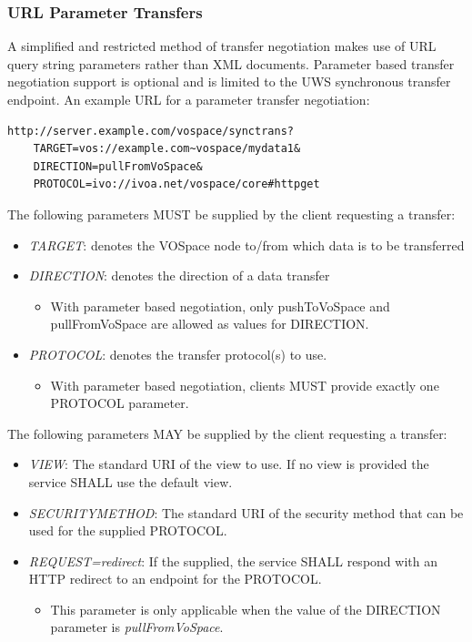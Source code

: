 \documentclass[11pt,a4paper]{ivoa}
\begin{document}
\subsubsection{URL Parameter Transfers}
\label{subsubsec:url parameter transfers}
A simplified and restricted method of transfer negotiation makes use of URL query string parameters rather than XML documents.  Parameter based transfer negotiation support is optional and is limited to the UWS synchronous transfer endpoint.  An example URL for a parameter transfer negotiation:

\begin{verbatim}
http://server.example.com/vospace/synctrans?
    TARGET=vos://example.com~vospace/mydata1&
    DIRECTION=pullFromVoSpace&
    PROTOCOL=ivo://ivoa.net/vospace/core#httpget
\end{verbatim}

The following parameters MUST be supplied by the client requesting a transfer:

\begin{itemize}
    \item \emph{TARGET}: denotes the VOSpace node to/from which data is to be transferred
    \item \emph{DIRECTION}: denotes the direction of a data transfer
        \begin{itemize}
            \item With parameter based negotiation, only pushToVoSpace and pullFromVoSpace are allowed as values for DIRECTION.
        \end{itemize}
    \item \emph{PROTOCOL}: denotes the transfer protocol(s) to use. 
        \begin{itemize}
            \item With parameter based negotiation, clients MUST provide exactly one PROTOCOL parameter.
        \end{itemize}
\end{itemize}

The following parameters MAY be supplied by the client requesting a transfer:

\begin{itemize}
    \item \emph{VIEW}: The standard URI of the view to use.  If no view is provided the service SHALL use the default view.
    \item \emph{SECURITYMETHOD}: The standard URI of the security method that can be used for the supplied PROTOCOL.
    \item \emph{REQUEST=redirect}: If the supplied, the service SHALL respond with an HTTP redirect to an endpoint for the PROTOCOL.
    \begin{itemize}
        \item This parameter is only applicable when the value of the DIRECTION parameter is \emph{pullFromVoSpace}.
    \end{itemize}
\end{itemize}
\end{document}
